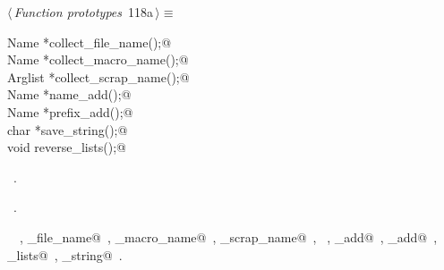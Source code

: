 \documentclass[a4paper]{report}
\begin{document}
\begin{flushleft} \small
\begin{minipage}{\linewidth}\label{scrap253}\raggedright\small
{} $\langle\,${\it Function prototypes}\nobreak\ {\footnotesize {118a}}$\,\rangle\equiv$
\vspace{-1ex}
\begin{list}{}{} \item
\mbox{}\verb@extern Name *collect_file_name();@\\
\mbox{}\verb@extern Name *collect_macro_name();@\\
\mbox{}\verb@extern Arglist *collect_scrap_name();@\\
\mbox{}\verb@extern Name *name_add();@\\
\mbox{}\verb@extern Name *prefix_add();@\\
\mbox{}\verb@extern char *save_string();@\\
\mbox{}\verb@extern void reverse_lists();@\\
\mbox{}\verb@@{\NWsep}
\end{list}
\vspace{-1.5ex}
\footnotesize
\begin{list}{}{\setlength{\itemsep}{-\parsep}\setlength{\itemindent}{-\leftmargin}}
\item \NWtxtMacroDefBy\ .
\item \NWtxtMacroRefIn\ .
\item \NWtxtIdentsUsed\nobreak\  \verb@Arglist@\nobreak\ , \verb@collect_file_name@\nobreak\ , \verb@collect_macro_name@\nobreak\ , \verb@collect_scrap_name@\nobreak\ , \verb@Name@\nobreak\ , \verb@name_add@\nobreak\ , \verb@prefix_add@\nobreak\ , \verb@reverse_lists@\nobreak\ , \verb@save_string@\nobreak\ .
\item{}
\end{list}
\end{minipage}\vspace{4ex}
\end{flushleft}
\end{document}
